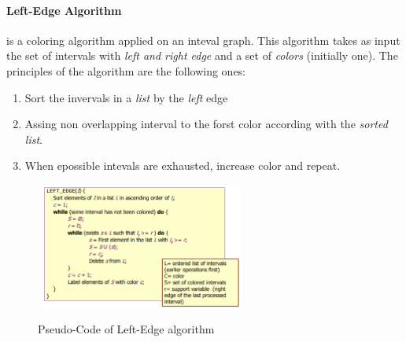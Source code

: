 \paragraph{Left-Edge Algorithm}
is a coloring algorithm applied on an inteval graph. This algorithm takes as input the set of intervals with \textit{left and right edge} and a set of \textit{colors} (initially one). The principles of the algorithm are the following ones:
\begin{enumerate}
	\item Sort the invervals in a \textit{list} by the \textit{left} edge
	\item Assing non overlapping interval to the forst color according with the \textit{sorted list}.
	\item When epossible intevals are exhausted, increase color and repeat.
\end{enumerate}
\begin{figure}[H]
	\centering$  $
	\includegraphics[width=0.60\textwidth]{./Cap5/Images/Image10.png}
	\caption{Pseudo-Code of Left-Edge algorithm}
	\label{fig:PseudoLEalg}
\end{figure}
